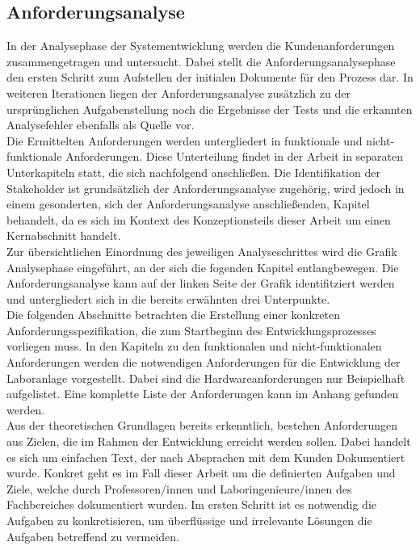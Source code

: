 \documentclass[../Bachelorarbeit.tex]{subfiles}
\begin{document}
\subsection{Anforderungsanalyse}
In der Analysephase der Systementwicklung werden die Kundenanforderungen zusammengetragen und untersucht. %
Dabei stellt die Anforderungsanalysephase den ersten Schritt zum Aufstellen der initialen Dokumente für den Prozess dar. In weiteren Iterationen liegen der Anforderungsanalyse zusätzlich zu der ursprünglichen Aufgabenstellung noch die Ergebnisse der Tests und die erkannten Analysefehler ebenfalls als Quelle vor.\\
Die Ermittelten Anforderungen werden untergliedert in funktionale und nicht-funktionale Anforderungen. Diese Unterteilung findet in der Arbeit in separaten Unterkapiteln statt, die sich nachfolgend anschließen. Die Identifikation der Stakeholder ist grundsätzlich der Anforderungsanalyse zugehörig, wird jedoch in einem gesonderten, sich der Anforderungsanalyse anschließenden, Kapitel behandelt, da es sich im Kontext des Konzeptionsteils dieser Arbeit um einen Kernabschnitt handelt.\\
Zur übersichtlichen Einordnung des jeweiligen Analyseschrittes wird die Grafik Analysephase eingeführt, an der sich die fogenden Kapitel entlangbewegen. Die Anforderungsanalyse kann auf der linken Seite der Grafik identifitziert werden und untergliedert sich in die bereits erwähnten drei Unterpunkte.\\
Die folgenden Abschnitte betrachten die Erstellung einer konkreten Anforderungsspezifikation, die zum Startbeginn des Entwicklungsprozesses vorliegen muss. In den Kapiteln zu den funktionalen und nicht-funktionalen Anforderungen werden die notwendigen Anforderungen für die Entwicklung der Laboranlage vorgestellt. Dabei sind die Hardwareanforderungen nur Beispielhaft aufgelistet. Eine komplette Liste der Anforderungen kann im Anhang gefunden werden. \\
Aus der theoretischen Grundlagen bereits erkenntlich, bestehen Anforderungen aus Zielen, die im Rahmen der Entwicklung erreicht werden sollen. Dabei handelt es sich um einfachen Text, der nach Absprachen mit dem Kunden Dokumentiert wurde. Konkret geht es im Fall dieser Arbeit um die definierten Aufgaben und Ziele, welche durch Professoren/innen und Laboringenieure/innen des Fachbereiches dokumentiert wurden. Im ersten Schritt ist es notwendig die Aufgaben zu konkretisieren, um überflüssige und irrelevante Lösungen die Aufgaben betreffend zu vermeiden.\\
\end{document}
